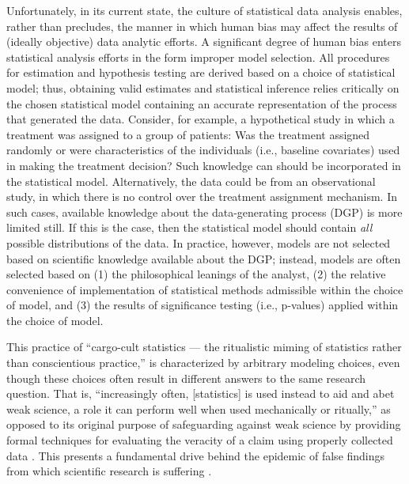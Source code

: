 \documentclass[
  12pt, krantz2,
]{krantz}
\theoremstyle{definition}
\theoremstyle{definition}
\theoremstyle{definition}
\newcommand{\1}{\mathbbm{1}}
\begin{document}
Unfortunately, in its current state, the culture of statistical data analysis
enables, rather than precludes, the manner in which human bias may affect the
results of (ideally objective) data analytic efforts. A significant degree of
human bias enters statistical analysis efforts in the form improper model
selection. All procedures for estimation and hypothesis testing are derived
based on a choice of statistical model; thus, obtaining valid estimates and
statistical inference relies critically on the chosen statistical model
containing an accurate representation of the process that generated the data.
Consider, for example, a hypothetical study in which a treatment was assigned to
a group of patients: Was the treatment assigned randomly or were characteristics
of the individuals (i.e., baseline covariates) used in making the treatment
decision? Such knowledge can should be incorporated in the statistical model.
Alternatively, the data could be from an observational study, in which there is
no control over the treatment assignment mechanism. In such cases, available
knowledge about the data-generating process (DGP) is more limited still. If
this is the case, then the statistical model should contain \emph{all} possible
distributions of the data. In practice, however, models are not selected based
on scientific knowledge available about the DGP; instead, models are often
selected based on (1) the philosophical leanings of the analyst, (2) the
relative convenience of implementation of statistical methods admissible within
the choice of model, and (3) the results of significance testing (i.e.,
p-values) applied within the choice of model.

This practice of ``cargo-cult statistics --- the ritualistic miming of statistics
rather than conscientious practice,'' \citep{stark2018cargo} is characterized by
arbitrary modeling choices, even though these choices often result in different
answers to the same research question. That is, ``increasingly often,
{[}statistics{]} is used instead to aid and abet weak science, a role it can perform
well when used mechanically or ritually,'' as opposed to its original purpose of
safeguarding against weak science by providing formal techniques for evaluating
the veracity of a claim using properly collected data \citep{stark2018cargo}. This
presents a fundamental drive behind the epidemic of false findings from which
scientific research is suffering \citep{vdl2014entering}.
\end{document}

